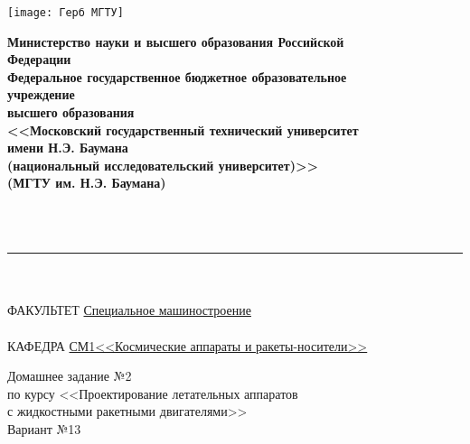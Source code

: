 \begin{minipage}{0.2\linewidth}
    \texttt{[image: Герб МГТУ]}
\end{minipage}
\begin{minipage}{0.8\linewidth}
    \begin{center}
        \begin{singlespace}
            \textbf{Министерство науки и высшего образования Российской \\ Федерации \\ Федеральное государственное бюджетное образовательное \\ учреждение \\ высшего образования \\ <<Московский государственный технический университет \\ имени Н.Э. Баумана \\ (национальный исследовательский университет)>> \\ (МГТУ им. Н.Э. Баумана)}
        \end{singlespace}
    \end{center}
\end{minipage}
\\
\\
\rule{\linewidth}{2pt} %
\\
\\
ФАКУЛЬТЕТ \underline{\hspace{0.25\linewidth} Специальное машиностроение \hspace{0.25\linewidth}}
\\
\\
КАФЕДРА \underline{\hspace{0.16\linewidth} СМ1<<Космические аппараты и ракеты-носители>> \hspace{0.16\linewidth}}
\\
\vspace{3.5cm}
\begin{center}
    \begin{minipage}{0.8\linewidth}
        \begin{center}
            \large Домашнее задание №2 \\ по курсу <<Проектирование летательных аппаратов \\ с жидкостными ракетными двигателями>>
            \\[10pt]
            \large Вариант №13
        \end{center}
    \end{minipage}
\end{center}
